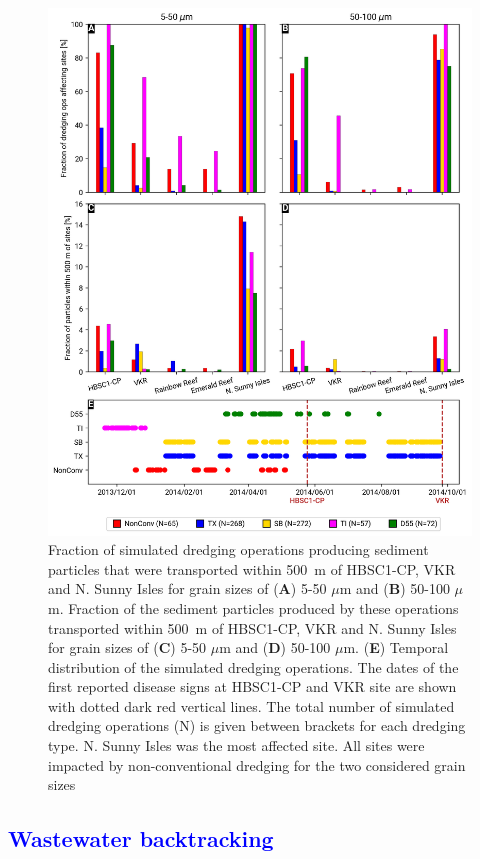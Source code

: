 \documentclass[preprint,12pt,authoryear]{elsarticle}
\newcommand{\modif}[1]{\textcolor{blue}{#1}}
\begin{document}
\begin{figure}
	\centering
	\includegraphics[width=.85\textwidth]{figures/aggregated_stokes4_v3_500m_timeline_rel.png}
	\caption{Fraction of simulated dredging operations producing sediment particles that were transported within 500~m of HBSC1-CP, VKR and N. Sunny Isles for grain sizes of (\textbf{A}) 5-50 $\mu$m  and (\textbf{B}) 50-100 $\mu$m. Fraction of the sediment particles produced by these operations transported within 500~m of HBSC1-CP, VKR and N. Sunny Isles for grain sizes of (\textbf{C}) 5-50 $\mu$m  and (\textbf{D}) 50-100 $\mu$m. (\textbf{E}) Temporal distribution of the simulated dredging operations. The dates of the first reported disease signs at HBSC1-CP and VKR site are shown with dotted dark red vertical lines. The total number of simulated dredging operations (N) is given between brackets for each dredging type. N. Sunny Isles was the most affected site. All sites were impacted by non-conventional dredging for the two considered grain sizes}\label{fig:onset_bar}
\end{figure}

\modif{\subsection{Wastewater backtracking}}
\end{document}
